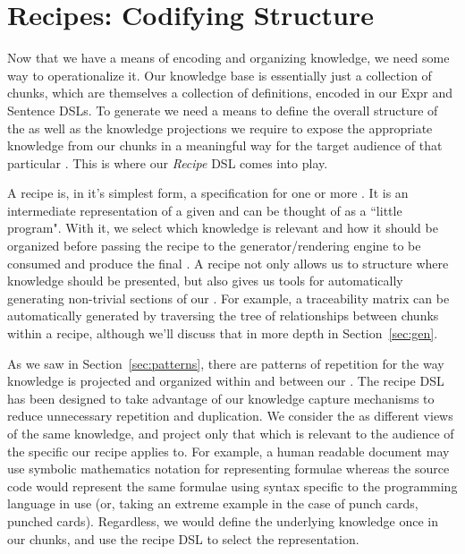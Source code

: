 

\section{Recipes: Codifying Structure}
\label{sec:recipes}

Now that we have a means of encoding and organizing knowledge, we need some 
way to operationalize it. Our knowledge base is essentially just a collection 
of chunks, which are themselves a collection of definitions, encoded in our 
Expr and Sentence DSLs. To generate \sfs{} we need a means to define the 
overall structure of the \sf{} as well as the knowledge projections we require 
to expose the appropriate knowledge from our chunks in a meaningful way for the 
target audience of that particular \sf{}. This is where our \emph{Recipe} DSL 
comes into play.

A recipe is, in it's simplest form, a specification for one or more \sfs{}. 
It is an intermediate representation of a given \sf{} and can be thought of as 
a ``little program". With it, we select which knowledge is relevant and how it 
should be organized before passing the recipe to the generator/rendering engine 
to be consumed and produce the final \sf{}. A recipe not only allows us to 
structure where knowledge should be presented, but also gives us tools for 
automatically generating non-trivial sections of our \sfs{}. For example, a 
traceability matrix can be automatically generated by traversing the tree of 
relationships between chunks within a recipe, although we'll discuss that in 
more depth in Section~\ref{sec:gen}.

As we saw in Section~\ref{sec:patterns}, there are patterns of repetition for 
the way knowledge is projected and organized within and between our \sfs{}. The 
recipe DSL has been designed to take advantage of our knowledge capture 
mechanisms to reduce unnecessary repetition and duplication. We consider the 
\sfs{} as different views of the same knowledge, and project only that which is 
relevant to the audience of the specific \sf{} our recipe applies to. For 
example, a human readable document may use symbolic mathematics notation for 
representing formulae whereas the source code would represent the same formulae 
using syntax specific to the programming language in use (or, taking an extreme 
example in the case of punch cards, punched cards). Regardless, we would define 
the underlying knowledge once in our chunks, and use the recipe DSL to select 
the representation.

